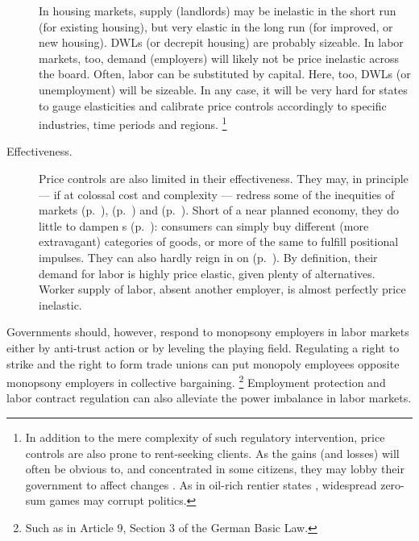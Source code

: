 \begin{description}
	In housing markets, supply (landlords) may be inelastic in the short run (for existing housing), but very elastic in the long run (for improved, or new housing).
	\glspl{DWL} (or decrepit housing) are probably sizeable.
	In labor markets, too, demand (employers) will likely not be price inelastic across the board.
	Often, labor can be substituted by capital.
	Here, too, \glspl{DWL} (or unemployment) will be sizeable.
	In any case, it will be very hard for states to gauge elasticities and calibrate price controls accordingly to specific industries, time periods and regions.
	\footnote{
		In addition to the mere complexity of such regulatory intervention, price controls are also prone to rent-seeking clients.
		As the gains (and losses) will often be obvious to, and concentrated in some citizens, they may lobby their government to affect changes \citep{Peltzman1976,Posner1975,Krueger1974}.
		As in oil-rich rentier states \citep{Beblawi1990}, widespread zero-sum games may corrupt politics.
	}

	\item[Effectiveness.]
	Price controls are also limited in their effectiveness.
	They may, in principle --- if at colossal cost and complexity --- redress some of the inequities of  markets (p.~\pageref{sec:winne-take-all}),  (p.~\pageref{sec:different-budget-constraints}) and  (p.~\pageref{sec:diminishing-marginal-utility}).
	Short of a near planned economy, they do little to dampen s (p.~\pageref{sec:positional-race}):
	 consumers can simply buy different (more extravagant) categories of goods, or more of the same to fulfill positional impulses.
	They can also hardly reign in on  (p.~\pageref{sec:monopsony-employers}).
	By definition, their demand for labor is highly price elastic, given plenty of alternatives.
	Worker supply of labor, absent another employer, is almost perfectly price inelastic.
\end{description}

Governments should, however, respond to monopsony employers in labor markets either by anti-trust action or by leveling the playing field.
Regulating a right to strike and the right to form trade unions can put monopoly employees opposite monopsony employers in collective bargaining.
\footnote{
	Such as in Article 9, Section 3 of the German Basic Law.
}
Employment protection and labor contract regulation can also alleviate the power imbalance in labor markets.

